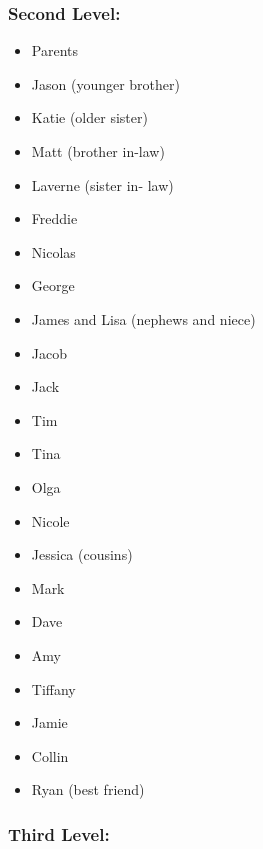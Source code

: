 \subsubsection*{Second Level:}
\begin{multicols}{2}
	\begin{itemize}[leftmargin=1.0cm]
		\item Parents
		\item Jason  \break(younger brother)
		\item Katie  \break(older sister)
		\item Matt  \break(brother in-law)
		\item Laverne  \break(sister in- law)
		\item Freddie
		\item Nicolas
		\item George
		\item James and Lisa \break(nephews and niece)
		\item Jacob
		\item Jack
		\item Tim
		\item Tina
		\item Olga
		\item Nicole
		\item Jessica \break(cousins)
		\item Mark
		\item Dave
		\item Amy
		\item Tiffany
		\item Jamie
		\item Collin
		\item Ryan  \break(best friend)
	\end{itemize}
\end{multicols}
\pagebreak \subsubsection*{Third Level:}
